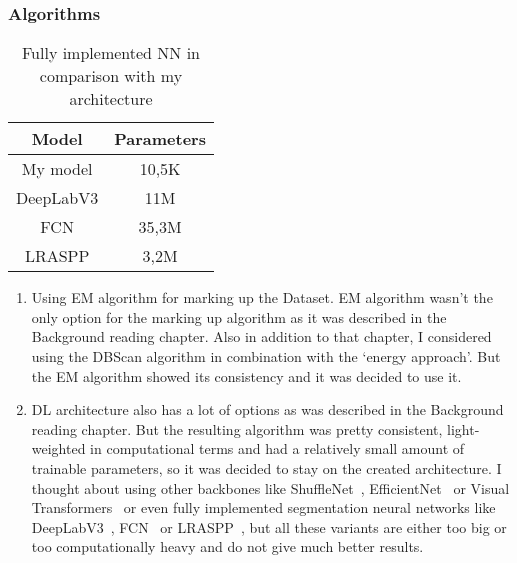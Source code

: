 \subsubsection{Algorithms}
\begin{table}[h]
    \centering 
    \begin{tabular}{|c|c|}
        \hline
        Model & Parameters \\ \hline
        My model & 10,5K \\ \hline
        DeepLabV3 & 11M  \\ \hline
        FCN & 35,3M \\  \hline
        LRASPP & 3,2M \\ \hline
    \end{tabular}
    \caption{Fully implemented NN in comparison with my architecture}\label{tab:nn_arcitecture}
\end{table}
\begin{enumerate}
    \item Using EM algorithm for marking up the Dataset. EM algorithm wasn't the only option for the marking up algorithm as it was described in 
    the Background reading chapter. Also in addition to that chapter, I considered using the DBScan algorithm in combination with the `energy approach'. 
    But the EM algorithm showed its consistency and it was decided to use it.
    \item DL architecture also has a lot of options as was described in the Background reading chapter. But the resulting algorithm was pretty consistent, light-weighted 
    in computational terms and had a relatively small amount of trainable parameters, so it was decided to stay on the created architecture. I thought about    using other 
    backbones like ShuffleNet~\cite{shufflenet}, EfficientNet~\cite{efficientnet} or Visual Transformers~\cite{transformers} or even fully implemented segmentation neural
    networks like DeepLabV3~\cite{deeplabv3}, FCN~\cite{FCN} or LRASPP~\cite{mobilenetv3}, but all these variants are either too big or too computationally heavy and do not 
    give much better results.
\end{enumerate}
